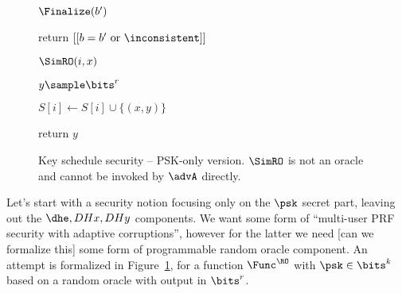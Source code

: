 \begin{figure}[t]
\begin{minipage}[t]{5cm}
		\begin{oracle}{$\Finalize(b')$}
			\item return $[[b = b' \text{ or } \inconsistent]]$
		\end{oracle}
	\end{minipage}
	\begin{minipage}[t]{3.5cm}
		\begin{oracle}{$\SimRO(i, x)$}
			\item $y \sample \bits^r$
			\item $S[i] \gets S[i] \cup \{(x,y)\}$
			\item return $y$
		\end{oracle}
	\end{minipage}
	
	\caption{%
		Key schedule security -- PSK-only version.
		$\SimRO$ is not an oracle and cannot be invoked by $\advA$ directly.
	}
	\label{fig:key-schedule-security_PSK}
\end{figure}

Let's start with a security notion focusing only on the $\psk$ secret part, leaving out the $\dhe, DHx, DHy$ components.
We want some form of ``multi-user PRF security with adaptive corruptions'', however for the latter we need [can we formalize this] some form of programmable random oracle component.
An attempt is formalized in Figure~\ref{fig:key-schedule-security_PSK}, for a function $\Func^\RO$ with $\psk \in \bits^k$ based on a random oracle with output in $\bits^r$.


